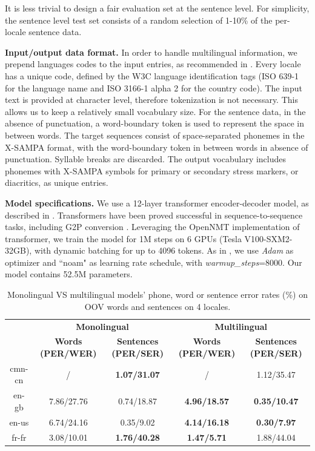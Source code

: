 It is less trivial to design a fair evaluation set at the sentence level.
For simplicity, the sentence level test set consists of a random selection of 1-10\% of the per-locale sentence data.


\textbf{Input/output data format.}
In order to handle multilingual information, we prepend languages codes to the input entries, as recommended in \cite{langid22}. Every locale has a unique code, defined by the W3C language identification tags (ISO 639-1 for the language name and ISO 3166-1 alpha 2 for the country code). The input text is provided at character level, therefore tokenization is not necessary. This allows us to keep a relatively small vocabulary size. For the sentence data, in the absence of punctuation, a word-boundary token is used to represent the space in between words. The target sequences consist of space-separated phonemes in the X-SAMPA format, with the word-boundary token in between words in absence of punctuation. Syllable breaks are discarded. The output vocabulary includes phonemes with X-SAMPA symbols for primary or secondary stress markers, or diacritics, as unique entries. 


\textbf{Model specifications.}
We use a 12-layer transformer encoder-decoder model, as described in \cite{vaswani17}. Transformers have been proved successful in sequence-to-sequence tasks, including G2P conversion \cite{Yolchuyeva_2019, multimodal19, amazon20, char_transformer20, apple_frontend20, gbert22}. Leveraging the OpenNMT \cite{opennmt} implementation of transformer, we train the model for 1M steps on 6 GPUs (Tesla V100-SXM2-32GB), with dynamic batching for up to 4096 tokens. As in \cite{vaswani17}, we use \textit{Adam} as optimizer and ``noam" as learning rate schedule, with \textit{warmup\_steps}=8000. Our model contains \mytextapprox52.5M parameters.



\begin{table}[t]
\centering
\begin{tabular}{ccccc}
\hline
 &

\multicolumn{2}{c}{\textbf{Monolingual}} &
\multicolumn{2}{c}{\textbf{Multilingual}} \\

&
\textbf{Words (PER/WER)} &
\textbf{Sentences (PER/SER)} &
\textbf{Words (PER/WER)} &
\textbf{Sentences (PER/SER)} \\

\hline
cmn-cn & 
/ & 
\textbf{1.07/31.07} & 
/ & 
1.12/35.47 \\

en-gb & 
7.86/27.76 & 
0.74/18.87 & 
\textbf{4.96/18.57} & 
\textbf{0.35/10.47} \\

en-us & 
6.74/24.16 & 
0.35/9.02 & 
\textbf{4.14/16.18} & 
\textbf{0.30/7.97}\\

fr-fr & 
3.08/10.01 & 
\textbf{1.76/40.28} & 
\textbf{1.47/5.71} & 
1.88/44.04  \\
\hline
\end{tabular}
\caption{Monolingual VS multilingual models' phone, word or sentence error rates (\%) on OOV words and sentences on 4 locales.}
\label{table:results}
\end{table}

